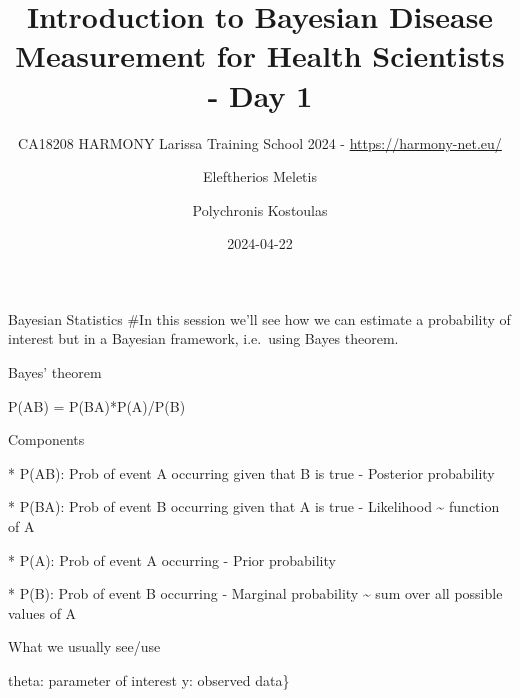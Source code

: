 \documentclass[
  ignorenonframetext,
]{beamer}
\title{Introduction to Bayesian Disease Measurement for Health
Scientists - Day 1}
\subtitle{CA18208 HARMONY Larissa Training School 2024 -
\url{https://harmony-net.eu/}}
\author{Eleftherios Meletis \and Polychronis Kostoulas}
\date{2024-04-22}
\begin{document}
\frame{\titlepage}

\begin{frame}{Bayesian Statistics}
\protect\hypertarget{bayesian-statistics}{}
\#In this session we'll see how we can estimate a probability of
interest but in a Bayesian framework, i.e.~using Bayes theorem.
\end{frame}

\begin{frame}{Bayes' theorem}
\protect\hypertarget{bayes-theorem}{}
\end{frame}

\begin{frame}{P(A\textbar B) = P(B\textbar A)*P(A)/P(B)}
\protect\hypertarget{pab-pbapapb}{}
\end{frame}

\begin{frame}{Components}
\protect\hypertarget{components}{}
\end{frame}

\begin{frame}{* P(A\textbar B): Prob of event A occurring given that B
is true - Posterior probability}
\protect\hypertarget{pab-prob-of-event-a-occurring-given-that-b-is-true---posterior-probability}{}
\end{frame}

\begin{frame}{* P(B\textbar A): Prob of event B occurring given that A
is true - Likelihood \textasciitilde{} function of A}
\protect\hypertarget{pba-prob-of-event-b-occurring-given-that-a-is-true---likelihood-function-of-a}{}
\end{frame}

\begin{frame}{* P(A): Prob of event A occurring - Prior probability}
\protect\hypertarget{pa-prob-of-event-a-occurring---prior-probability}{}
\end{frame}

\begin{frame}{* P(B): Prob of event B occurring - Marginal probability
\textasciitilde{} sum over all possible values of A}
\protect\hypertarget{pb-prob-of-event-b-occurring---marginal-probability-sum-over-all-possible-values-of-a}{}
\end{frame}

\begin{frame}{What we usually see/use}
\protect\hypertarget{what-we-usually-seeuse}{}
\end{frame}

\begin{frame}{theta: parameter of interest \textbar{} y: observed
data\}}
\protect\hypertarget{theta-parameter-of-interest-y-observed-data}{}
\end{frame}
\end{document}

